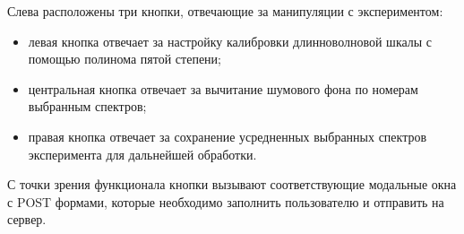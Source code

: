 Слева расположены три кнопки, отвечающие за манипуляции с экспериментом:
\begin{itemize}
\item левая кнопка отвечает за настройку калибровки длинноволновой шкалы с помощью полинома пятой степени;
\item центральная кнопка отвечает за вычитание шумового фона по номерам выбранным спектров;
\item правая кнопка отвечает за сохранение усредненных выбранных спектров эксперимента для дальнейшей обработки.
\end{itemize}

С точки зрения функционала кнопки вызывают соответствующие модальные окна с POST формами, которые необходимо заполнить
пользователю и отправить на сервер.



























